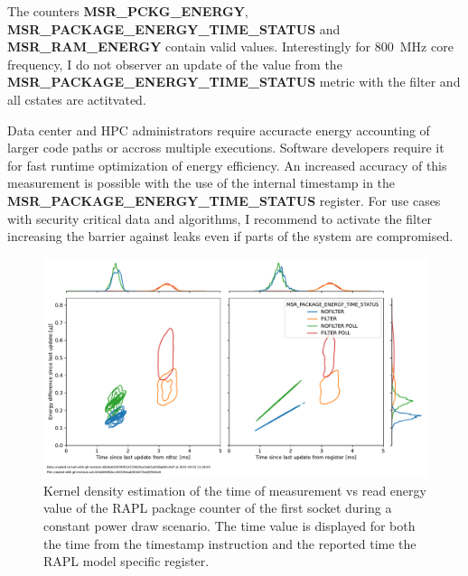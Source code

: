 The counters \textbf{MSR\_PCKG\_ENERGY}, \textbf{MSR\_PACKAGE\_ENERGY\_TIME\_STATUS} and \textbf{MSR\_RAM\_ENERGY} contain valid values.
Interestingly for \SI{800}{\MHz} core frequency, I do not observer an update of the value from the \textbf{MSR\_PACKAGE\_ENERGY\_TIME\_STATUS} metric with the filter and all cstates are actitvated.

Data center and HPC administrators require accuracte energy accounting of larger code paths or accross multiple executions.
Software developers require it for fast runtime optimization of energy efficiency.
An increased accuracy of this measurement is possible with the use of the internal timestamp in the \textbf{MSR\_PACKAGE\_ENERGY\_TIME\_STATUS} register.
For use cases with security critical data and algorithms, I recommend to activate the filter increasing the barrier against leaks even if parts of the system are compromised.

\begin{figure}[]
    \centering
    \includegraphics[width=\columnwidth]{fig/rapl-update-intervals/MSR_PACKAGE_ENERGY_TIME_STATUS_2000000.pdf}
    \caption{\label{fig:rapl-update-intervals-package}Kernel density estimation of the time of measurement vs read energy value of the RAPL package counter of the first socket during a constant power draw scenario.
    The time value is displayed for both the time from the timestamp instruction and the reported time the RAPL model specific register.}
\end{figure}

